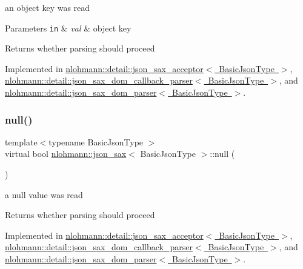 an object key was read 


\begin{DoxyParams}[1]{Parameters}
\mbox{\tt in}  & {\em val} & object key \\
\hline
\end{DoxyParams}
\begin{DoxyReturn}{Returns}
whether parsing should proceed 
\end{DoxyReturn}


Implemented in \mbox{\hyperlink{classnlohmann_1_1detail_1_1json__sax__acceptor_aba0060ee0b3156682d93bbd4be96a0cc}{nlohmann\+::detail\+::json\+\_\+sax\+\_\+acceptor$<$ Basic\+Json\+Type $>$}}, \mbox{\hyperlink{classnlohmann_1_1detail_1_1json__sax__dom__callback__parser_a5d268b49412ac97ab798d488c8e2cb12}{nlohmann\+::detail\+::json\+\_\+sax\+\_\+dom\+\_\+callback\+\_\+parser$<$ Basic\+Json\+Type $>$}}, and \mbox{\hyperlink{classnlohmann_1_1detail_1_1json__sax__dom__parser_a76014cffa8ce9c4bb4b25a538c5a3920}{nlohmann\+::detail\+::json\+\_\+sax\+\_\+dom\+\_\+parser$<$ Basic\+Json\+Type $>$}}.

\mbox{\label{structnlohmann_1_1json__sax_a0ad26edef3f8d530dcec3192bba82df6}} 
\subsubsection{\texorpdfstring{null()}{null()}}
{\footnotesize\ttfamily template$<$typename Basic\+Json\+Type $>$ \\
virtual bool \mbox{\hyperlink{structnlohmann_1_1json__sax}{nlohmann\+::json\+\_\+sax}}$<$ Basic\+Json\+Type $>$\+::null (\begin{DoxyParamCaption}{ }\end{DoxyParamCaption})\hspace{0.3cm}{\ttfamily [pure virtual]}}



a null value was read 

\begin{DoxyReturn}{Returns}
whether parsing should proceed 
\end{DoxyReturn}


Implemented in \mbox{\hyperlink{classnlohmann_1_1detail_1_1json__sax__acceptor_a173c310b2f829b2c49645af8336c27b8}{nlohmann\+::detail\+::json\+\_\+sax\+\_\+acceptor$<$ Basic\+Json\+Type $>$}}, \mbox{\hyperlink{classnlohmann_1_1detail_1_1json__sax__dom__callback__parser_a2db7733c5d6fb6135f03f8b64811baf4}{nlohmann\+::detail\+::json\+\_\+sax\+\_\+dom\+\_\+callback\+\_\+parser$<$ Basic\+Json\+Type $>$}}, and \mbox{\hyperlink{classnlohmann_1_1detail_1_1json__sax__dom__parser_a0ec9faafc4b8d4052a6ed6d3b720d748}{nlohmann\+::detail\+::json\+\_\+sax\+\_\+dom\+\_\+parser$<$ Basic\+Json\+Type $>$}}.

